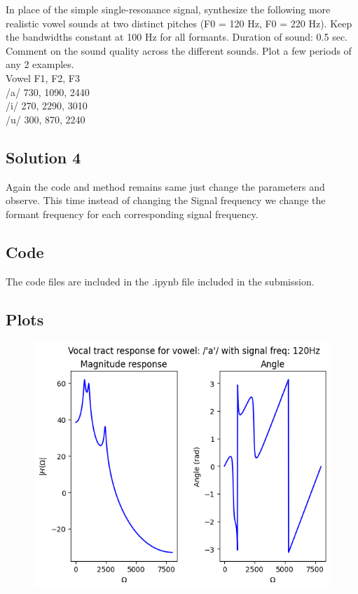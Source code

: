 \documentclass{article}
\begin{document}
In place of the simple single-resonance signal, synthesize the following more realistic vowel sounds at two distinct pitches (F0 = 120 Hz, F0 = 220 Hz). Keep the bandwidths constant at 100 Hz for all formants. Duration of sound: 0.5 sec. Comment on the sound quality across the different sounds. Plot a few periods of any 2 examples.\\
Vowel F1, F2, F3\\
/a/ 730, 1090, 2440 \\
/i/ 270, 2290, 3010 \\
/u/ 300, 870, 2240 \\

\subsection{Solution 4}
Again the code and method remains same just change the parameters and observe. This time instead of changing the Signal frequency we change the formant frequency for each corresponding signal frequency.


\subsection{Code}
The code files are included in the .ipynb file included in the submission.

\subsection{Plots}


\begin{figure}[H]
\begin{center}
\includegraphics[scale = 0.5]{Q4_A1.png}
\end{center}
\end{figure}
\end{document}
